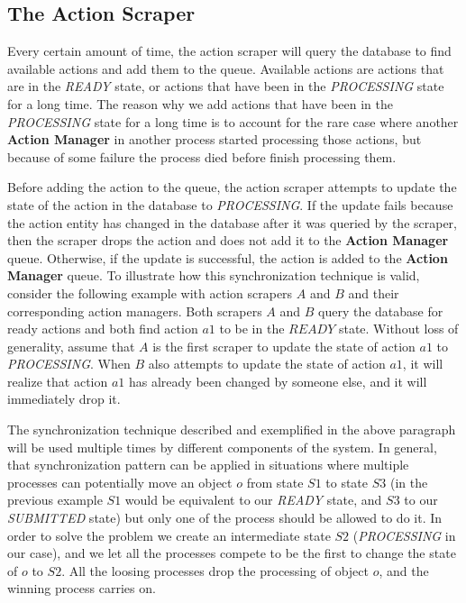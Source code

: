 \subsection{The Action Scraper}
Every certain amount of time, the action scraper will query the database to find available actions and add them to the queue. Available actions are actions that are in the \textit{READY} state, or actions that have been in the \textit{PROCESSING} state for a long time. The reason why we add actions that have been in the \textit{PROCESSING} state for a long time is to account for the rare case where another \textbf{Action Manager} in another process started processing those actions, but because of some failure the process died before finish processing them.

Before adding the action to the queue, the action scraper attempts to update the state of the action in the database to \textit{PROCESSING}. If the update fails because the action entity has changed in the database after it was queried by the scraper, then the scraper drops the action and does not add it to the \textbf{Action Manager} queue. Otherwise, if the update is successful, the action is added to the \textbf{Action Manager} queue. To illustrate how this synchronization technique is valid, consider the following example with action scrapers $A$ and $B$ and their corresponding action managers. Both scrapers $A$ and $B$ query the database for ready actions and both find action $a1$ to be in the $READY$ state. Without loss of generality, assume that $A$ is the first scraper to update the state of action $a1$ to \textit{PROCESSING}. When $B$ also attempts to update the state of action $a1$, it will realize that action $a1$ has already been changed by someone else, and it will immediately drop it.

The synchronization technique described and exemplified in the above paragraph will be used multiple times by different components of the system. In general, that synchronization pattern can be applied in situations where multiple processes can potentially move an object $o$ from state $S1$ to state $S3$ (in the previous example $S1$ would be equivalent to our \textit{READY} state, and $S3$ to our \textit{SUBMITTED} state) but only one of the process should be allowed to do it. In order to solve the problem we create an intermediate state $S2$ (\textit{PROCESSING} in our case), and we let all the processes compete to be the first to change the state of $o$ to $S2$. All the loosing processes drop the processing of object $o$, and the winning process carries on.

